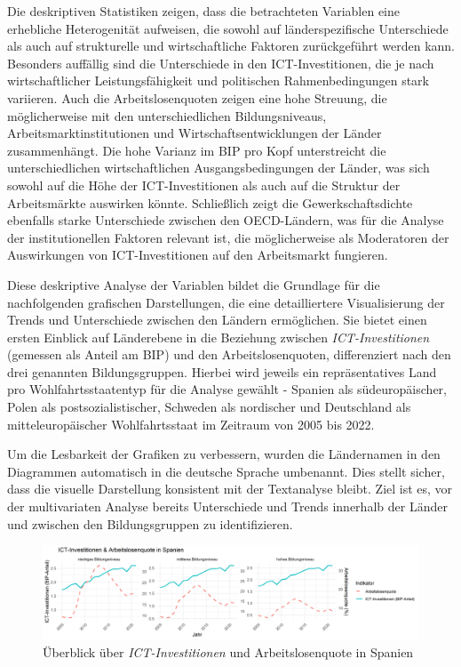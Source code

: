 Die deskriptiven Statistiken zeigen, dass die betrachteten Variablen eine erhebliche 
Heterogenität aufweisen, die sowohl auf länderspezifische Unterschiede als auch auf 
strukturelle und wirtschaftliche Faktoren zurückgeführt werden kann. Besonders auffällig 
sind die Unterschiede in den \ac{ICT}-Investitionen, die je nach wirtschaftlicher 
Leistungsfähigkeit und politischen Rahmenbedingungen stark variieren. Auch die 
Arbeitslosenquoten zeigen eine hohe Streuung, die möglicherweise mit den unterschiedlichen 
Bildungsniveaus, Arbeitsmarktinstitutionen und Wirtschaftsentwicklungen der Länder 
zusammenhängt. Die hohe Varianz im \ac{BIP} pro Kopf unterstreicht die unterschiedlichen 
wirtschaftlichen Ausgangsbedingungen der Länder, was sich sowohl auf die Höhe der 
\ac{ICT}-Investitionen als auch auf die Struktur der Arbeitsmärkte auswirken könnte. 
Schließlich zeigt die Gewerkschaftsdichte ebenfalls starke Unterschiede zwischen den 
OECD-Ländern, was für die Analyse der institutionellen Faktoren relevant ist, die 
möglicherweise als Moderatoren der Auswirkungen von \ac{ICT}-Investitionen auf den 
Arbeitsmarkt fungieren.

Diese deskriptive Analyse der Variablen bildet die Grundlage für die nachfolgenden 
grafischen Darstellungen, die eine detailliertere Visualisierung der Trends und Unterschiede 
zwischen den Ländern ermöglichen. Sie bietet einen ersten Einblick auf Länderebene in die 
Beziehung zwischen \textit{\ac{ICT}-Investitionen} (gemessen als Anteil am \ac{BIP}) und 
den Arbeitslosenquoten, differenziert nach den drei genannten Bildungsgruppen. Hierbei 
wird jeweils ein repräsentatives Land pro Wohlfahrtsstaatentyp für die Analyse gewählt - 
Spanien als südeuropäischer, Polen als postsozialistischer, Schweden als nordischer und 
Deutschland als mitteleuropäischer Wohlfahrtsstaat im Zeitraum von 2005 bis 2022. 

Um die Lesbarkeit der Grafiken zu verbessern, wurden die Ländernamen in den Diagrammen automatisch 
in die deutsche Sprache umbenannt. Dies stellt sicher, dass die visuelle Darstellung konsistent 
mit der Textanalyse bleibt. Ziel ist es, vor der multivariaten Analyse bereits Unterschiede und 
Trends innerhalb der Länder und zwischen den Bildungsgruppen zu identifizieren.


\begin{figure}[htbp]
    \centering
    \includegraphics[width=\textwidth]{assets/plot_spain_final.png}
    \caption{Überblick über \textit{\ac{ICT}-Investitionen} und Arbeitslosenquote in 
    Spanien}
    \label{fig:spain}
\end{figure}

